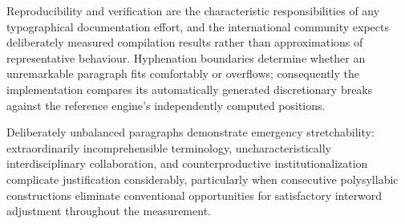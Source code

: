 \documentclass[12pt]{article}
\begin{document}
Reproducibility and verification are the characteristic responsibilities of any typographical documentation effort, and the international community expects deliberately measured compilation results rather than approximations of representative behaviour. Hyphenation boundaries determine whether an unremarkable paragraph fits comfortably or overflows; consequently the implementation compares its automatically generated discretionary breaks against the reference engine's independently computed positions.

Deliberately unbalanced paragraphs demonstrate emergency stretchability: extraordinarily incomprehensible terminology, uncharacteristically interdisciplinary collaboration, and counterproductive institutionalization complicate justification considerably, particularly when consecutive polysyllabic constructions eliminate conventional opportunities for satisfactory interword adjustment throughout the measurement.
\end{document}
